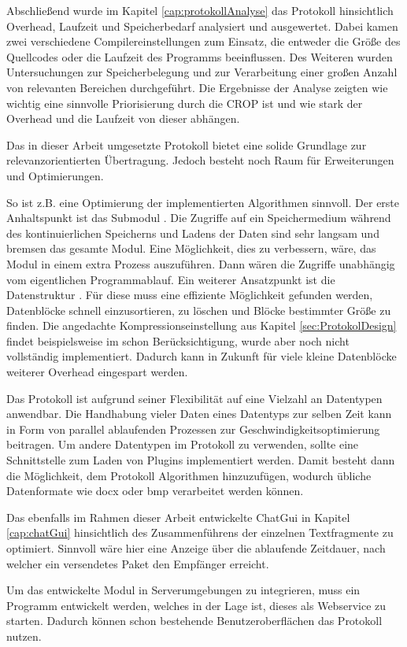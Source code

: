 Abschließend wurde im Kapitel \ref{cap:protokollAnalyse} das Protokoll
hinsichtlich Overhead, Laufzeit und Speicherbedarf analysiert und ausgewertet.
Dabei kamen zwei verschiedene Compilereinstellungen zum Einsatz, die entweder
die Größe des Quellcodes oder die Laufzeit des Programms beeinflussen. Des
Weiteren wurden Untersuchungen zur Speicherbelegung und zur Verarbeitung einer
großen Anzahl von relevanten Bereichen durchgeführt. Die Ergebnisse der Analyse
zeigten wie wichtig eine sinnvolle Priorisierung durch die \gls{CROP} ist und
wie stark der Overhead und die Laufzeit von dieser abhängen.

Das in dieser Arbeit umgesetzte Protokoll bietet eine solide
Grundlage zur relevanzorientierten Übertragung. Jedoch besteht noch Raum
für Erweiterungen und Optimierungen.

So ist z.B. eine Optimierung der implementierten Algorithmen sinnvoll.
Der erste Anhaltspunkt ist das Submodul .
Die Zugriffe auf ein Speichermedium während des kontinuierlichen Speicherns und
Ladens der Daten sind sehr langsam und bremsen das gesamte Modul. Eine
Möglichkeit, dies zu verbessern, wäre, das Modul in einem extra Prozess
auszuf{\"u}hren. Dann wären die Zugriffe unabhängig vom eigentlichen
Programmablauf. Ein weiterer Ansatzpunkt ist die Datenstruktur
. Für diese muss eine effiziente Möglichkeit
gefunden werden, Datenblöcke schnell einzusortieren, zu löschen und Bl{\"o}cke
bestimmter Größe zu finden.
Die angedachte Kompressionseinstellung aus Kapitel \ref{sec:ProtokolDesign}
findet beispielsweise im  schon Berücksichtigung, wurde aber
noch nicht vollständig implementiert. Dadurch kann in Zukunft für viele kleine
Datenblöcke weiterer Overhead eingespart werden.

Das Protokoll ist aufgrund seiner Flexibilität auf eine Vielzahl an Datentypen
anwendbar. Die Handhabung vieler Daten eines Datentyps zur selben Zeit kann
in Form von parallel ablaufenden Prozessen zur Geschwindigkeitsoptimierung
beitragen. Um andere Datentypen im Protokoll zu verwenden, sollte eine
Schnittstelle zum Laden von Plugins implementiert werden. Damit besteht dann die
Möglichkeit, dem Protokoll Algorithmen hinzuzufügen, wodurch
übliche Datenformate wie docx oder bmp verarbeitet werden können.

Das ebenfalls im Rahmen dieser Arbeit entwickelte ChatGui in Kapitel
\ref{cap:chatGui} hinsichtlich des Zusammenführens der einzelnen Textfragmente
zu optimiert. Sinnvoll wäre hier eine Anzeige über die ablaufende Zeitdauer,
nach welcher ein versendetes Paket den Empfänger erreicht.

Um das entwickelte Modul in Serverumgebungen zu integrieren, muss ein Programm
entwickelt werden, welches in der Lage ist, dieses als Webservice zu starten.
Dadurch können schon bestehende Benutzeroberflächen das Protokoll nutzen.
